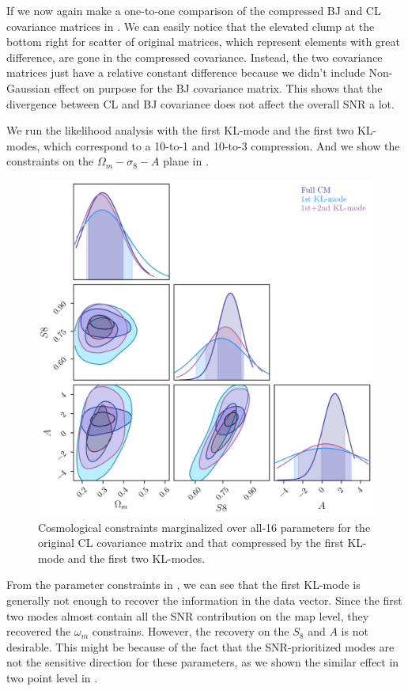\documentclass[twocolumn]{\docclass}
\begin{document}
	If we now again make a one-to-one comparison of the compressed BJ and CL covariance matrices in . We can easily notice that the elevated clump at the bottom right for scatter of original matrices, which represent elements with great difference, are gone in the compressed covariance. Instead, the two covariance matrices just have a relative constant difference because we didn't include Non-Gaussian effect on purpose for the BJ covariance matrix. This shows that the divergence between CL and BJ covariance does not affect the overall SNR a lot. 
	
	We run the likelihood analysis with the first KL-mode and the first two KL-modes, which correspond to a 10-to-1 and 10-to-3 compression. And we show the constraints on the $\Omega_m - \sigma_8 - A$ plane in .
	
	\begin{figure}
		\includegraphics[width=0.8\columnwidth]{om_s8_A_full_1st_2nd.png}
		\caption{ Cosmological constraints marginalized over all-16 parameters for the original CL covariance matrix and that compressed by the first KL-mode and the first two KL-modes.\label{fig:kl-constaints}}
	\end{figure}
	
	From the parameter constraints in , we can see that the first KL-mode is generally not enough to recover the information in the data vector. Since the first two modes almost contain all the SNR contribution on the map level, they recovered the $\omega_m$ constrains. However, the recovery on the $S_8$ and $A$ is not desirable. This might be because of the fact that the SNR-prioritized modes are not the sensitive direction for these parameters, as we shown the similar effect in two point level in . 
	
\end{document}
